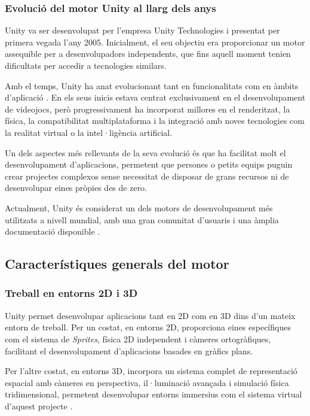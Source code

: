 \documentclass[a4paper,11pt,DIV=13,headings=normal,abstract=true,twoside=semi]{article}
\begin{document}
\subsubsection{Evolució del motor Unity al llarg dels anys}

Unity va ser desenvolupat per l'empresa Unity Technologies i presentat per primera vegada l'any 2005. Inicialment, el seu objectiu era proporcionar un motor assequible per a desenvolupadors independents, que fins aquell moment tenien dificultats per accedir a tecnologies similars.

Amb el temps, Unity ha anat evolucionant tant en funcionalitats com en àmbits d'aplicació \cite{UnityLearnIntro}. En els seus inicis estava centrat exclusivament en el desenvolupament de videojocs, però progressivament ha incorporat millores en el renderitzat, la física, la compatibilitat multiplataforma i la integració amb noves tecnologies com la realitat virtual o la intel·ligència artificial.

Un dels aspectes més rellevants de la seva evolució és que ha facilitat molt el desenvolupament d'aplicacions, permetent que persones o petits equips puguin crear projectes complexos sense necessitat de disposar de grans recursos ni de desenvolupar eines pròpies des de zero.

Actualment, Unity és considerat un dels motors de desenvolupament més utilitzats a nivell mundial, amb una gran comunitat d'usuaris i una àmplia documentació disponible \cite{UnityWikipedia}.

\subsection{Característiques generals del motor}

\subsubsection{Treball en entorns 2D i 3D}

Unity permet desenvolupar aplicacions tant en 2D com en 3D dins d'un mateix entorn de treball. Per un costat, en entorns 2D, proporciona eines específiques com el sistema de \textit{Sprites}, física 2D independent i càmeres ortogràfiques, facilitant el desenvolupament d'aplicacions basades en gràfics plans.

Per l'altre costat, en entorns 3D, incorpora un sistema complet de representació espacial amb càmeres en perspectiva, il·luminació avançada i simulació física tridimensional, permetent desenvolupar entorns immersius com el sistema virtual d'aquest projecte \cite{Unity2Dor3D}.
\end{document}
